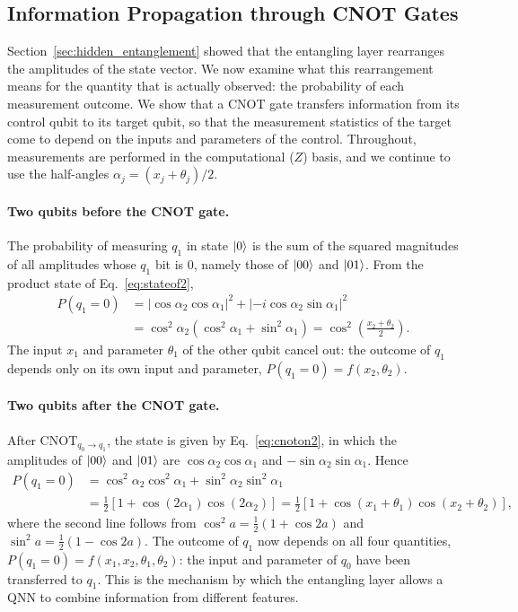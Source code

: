 \documentclass[12pt]{article}
\numberwithin{equation}{section}  %
\begin{document}
\subsection{Information Propagation through CNOT Gates}
\label{sec:cnot_propagation}

Section~\ref{sec:hidden_entanglement} showed that the entangling layer rearranges the amplitudes of the state vector. We now examine what this rearrangement means for the quantity that is actually observed: the probability of each measurement outcome. We show that a CNOT gate transfers information from its control qubit to its target qubit, so that the measurement statistics of the target come to depend on the inputs and parameters of the control. Throughout, measurements are performed in the computational ($Z$) basis, and we continue to use the half-angles $\alpha_j = (x_j + \theta_j)/2$.

\paragraph{Two qubits before the CNOT gate.} The probability of measuring $q_1$ in state $\ket{0}$ is the sum of the squared magnitudes of all amplitudes whose $q_1$ bit is $0$, namely those of $\ket{00}$ and $\ket{01}$. From the product state of Eq.~\eqref{eq:stateof2},
\begin{equation}
\begin{aligned}
P(q_1 = 0) &= |\cos\alpha_2 \cos\alpha_1|^2 + |-i\cos\alpha_2 \sin\alpha_1|^2 \\
&= \cos^2\alpha_2 \left(\cos^2\alpha_1 + \sin^2\alpha_1\right)
= \cos^2\!\left(\frac{x_2 + \theta_2}{2}\right).
\end{aligned}
\label{eq:p_q1_before}
\end{equation}
The input $x_1$ and parameter $\theta_1$ of the other qubit cancel out: the outcome of $q_1$ depends only on its own input and parameter, $P(q_1 = 0) = f(x_2, \theta_2)$.

\paragraph{Two qubits after the CNOT gate.} After $\mathrm{CNOT}_{q_0 \to q_1}$, the state is given by Eq.~\eqref{eq:cnoton2}, in which the amplitudes of $\ket{00}$ and $\ket{01}$ are $\cos\alpha_2 \cos\alpha_1$ and $-\sin\alpha_2 \sin\alpha_1$. Hence
\begin{equation}
\begin{aligned}
P(q_1 = 0) &= \cos^2\alpha_2 \cos^2\alpha_1 + \sin^2\alpha_2 \sin^2\alpha_1 \\
&= \frac{1}{2}\left[1 + \cos(2\alpha_1)\cos(2\alpha_2)\right]
= \frac{1}{2}\left[1 + \cos(x_1 + \theta_1)\cos(x_2 + \theta_2)\right],
\end{aligned}
\label{eq:p_q1_after}
\end{equation}
where the second line follows from $\cos^2 a = \frac{1}{2}(1 + \cos 2a)$ and $\sin^2 a = \frac{1}{2}(1 - \cos 2a)$. The outcome of $q_1$ now depends on all four quantities, $P(q_1 = 0) = f(x_1, x_2, \theta_1, \theta_2)$: the input and parameter of $q_0$ have been transferred to $q_1$. This is the mechanism by which the entangling layer allows a QNN to combine information from different features.
\end{document}
